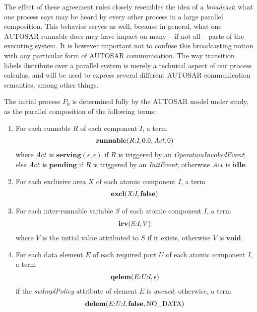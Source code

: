 \documentclass[twocolumn]{article}
\newcommand{\V}[1]{\text{\it #1}}
\newcommand{\Act}  {\V{Act}}
\newcommand{\kw}[1]{\textbf{#1}}
\newcommand{\void}    {\kw{void}}
\newcommand{\false}   {\kw{false}}
\newcommand{\idle}    {\kw{idle}}
\newcommand{\pending} {\kw{pending}}
\newcommand{\serving}[2]{\kw{serving}(#1,#2)}
\newcommand{\adr}[1]{\emph{#1}}
\newcommand{\runnable}[4]{\kw{runnable}(#1,#2,#3,#4)}
\newcommand{\excl}    [2]{\kw{excl}(#1,#2)}
\newcommand{\irv}     [2]{\kw{irv}(#1,#2)}
\newcommand{\qelem}   [2]{\kw{qelem}(#1,#2)}
\newcommand{\delem}   [3]{\kw{delem}(#1,#2,#3)}
\begin{document}
The effect of these agreement rules closely resembles the idea of a \emph{broadcast}: what one process says may be heard by every other process in a large parallel composition. This behavior serves us well, because in general, what one AUTOSAR runnable does may have impact on many -- if not all -- parts of the executing system. It is however important not to confuse this broadcasting notion with any particular form of AUTOSAR communication. The way transition labels distribute over a parallel system is merely a technical aspect of our process calculus, and will be used to express several different AUTOSAR communication semantics, among other things.

The initial process $P_0$ is determined fully by the AUTOSAR model under study, as the parallel composition of the following terms:
\begin{enumerate}

\item For each runnable $R$ of each component $I$, a term
$$
\begin{array}{c}
	\runnable{\adr{R:I}}{0.0}{\Act}{0}
\end{array}
$$
where $\Act$ is $\serving{\epsilon}{\epsilon}$ if $R$ is triggered by an \emph{OperationInvokedEvent}; else $\Act$ is $\pending$ if $R$ is triggered by an \emph{InitEvent}; otherwise $\Act$ is $\idle$.

\item For each exclusive area $X$ of each atomic component $I$, a term
$$
\begin{array}{c}
	\excl{\adr{X:I}}{\false}
\end{array}
$$

\item For each inter-runnable variable $S$ of each atomic component $I$, a term
$$
\begin{array}{c}
	\irv{\adr{S:I}}{V}
\end{array}
$$
where $V$ is the initial value attributed to $S$ if it exists, otherwise $V$ is $\void$.

\item For each data element $E$ of each required port $U$ of each atomic component $I$, a term
$$
\begin{array}{c}
	\qelem{\adr{E:U:I}}{\epsilon}
\end{array}
$$
if the \emph{swImplPolicy} attribute of element $E$ is \emph{queued}; otherwise, a term
$$
\begin{array}{c}
	\delem{\adr{E:U:I}}{\false}{\text{NO\_DATA}}
\end{array}
$$


\end{enumerate}
\end{document}
